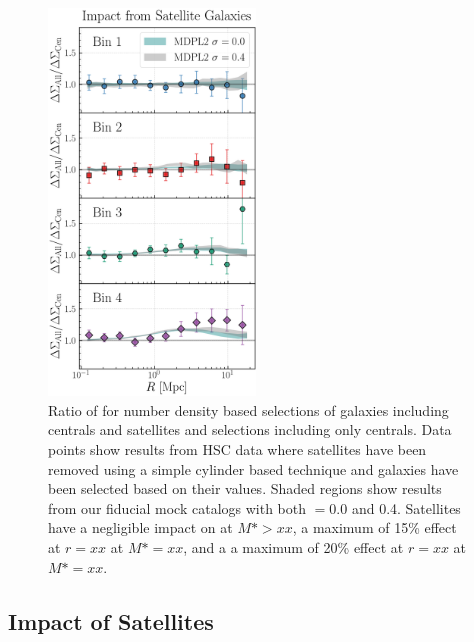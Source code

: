 \documentclass[a4paper,fleqn,usenatbib]{mnras}
\begin{document}
  \begin{figure}
      \centering
      \includegraphics[width=0.49\textwidth]{figure/dsigma_sat_ratio}
      \caption{Ratio of \dsigma{} for number density based selections of galaxies including centrals and satellites and selections including only centrals. Data points show results from HSC data where satellites have been removed using a simple cylinder based technique and galaxies have been selected based on their \mmax{} values. Shaded regions show results from our fiducial mock catalogs with both \sigmh{}$=0.0$ and 0.4. Satellites have a negligible impact on \dsigma{} at $M*>xx$, a maximum of 15\% effect at $r=xx$ at $M*=xx$, and a a maximum of 20\% effect at $r=xx$ at $M*=xx$. }
      \label{fig:satellite}
  \end{figure}

\subsection{Impact of Satellites}
    \label{sec:satellite}
\end{document}
